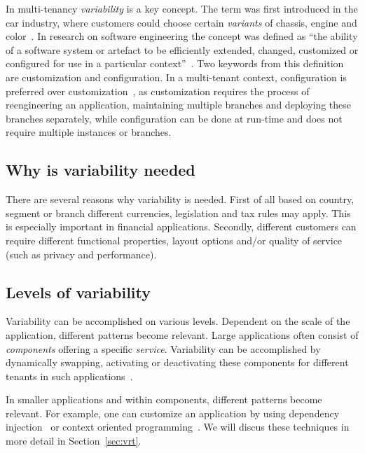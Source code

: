In multi-tenancy \textit{variability} is a key concept. The term was first introduced in the car industry, where customers could choose certain \textit{variants} of chassis, engine and color~\cite[p. 153]{kabbedijk2011variability}. 
In research on software engineering the concept was defined as ``the ability of a software system or artefact to be efficiently extended, changed, customized or configured for use in a particular context''~\cite{svahnberg2005taxonomy}.
Two keywords from this definition are customization and configuration. 
In a multi-tenant context, configuration is preferred over customization~\cite{sun2008software}, as customization requires the process of reengineering an application, maintaining multiple branches and deploying these branches separately, while configuration can be done at run-time and does not require multiple instances or branches.

\subsection{Why is variability needed}
There are several reasons why variability is needed. 
First of all based on country, segment or branch different currencies, legislation and tax rules may apply. This is especially important in financial applications. 
Secondly, different customers can require different functional properties, layout options and/or quality of service (such as privacy and performance).

\subsection{Levels of variability}
Variability can be accomplished on various levels. 
Dependent on the scale of the application, different patterns become relevant. Large applications often consist of \textit{components} offering a specific \textit{service}. Variability can be accomplished by dynamically swapping, activating or deactivating  these components for different tenants in such applications~\cite{mietzner2008defining}. 

In smaller applications and within components, different patterns become relevant. For example, one can customize an application by using dependency injection~\cite{walraven2011middleware} or context oriented programming~\cite{truyen2012context}. We will discus these techniques in more detail in Section~\ref{sec:vrt}.

